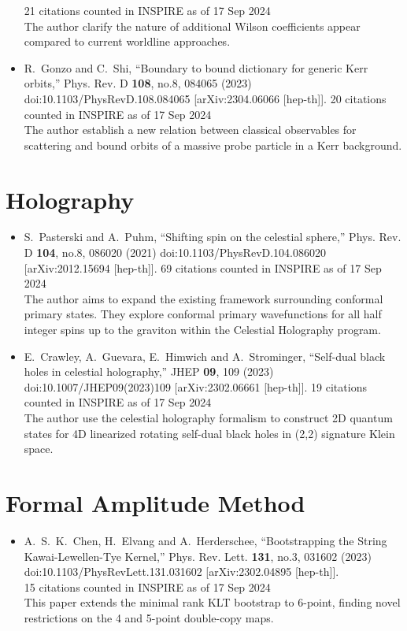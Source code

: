\documentclass[a4paper,12pt]{article}
\begin{document}
\begin{itemize}
    21 citations counted in INSPIRE as of 17 Sep 2024\\
    The author clarify the nature of additional Wilson coefficients appear compared to current worldline approaches.
    \item %
    R.~Gonzo and C.~Shi,
    ``Boundary to bound dictionary for generic Kerr orbits,''
    Phys. Rev. D \textbf{108}, no.8, 084065 (2023)
    doi:10.1103/PhysRevD.108.084065
    [arXiv:2304.06066 [hep-th]].
    20 citations counted in INSPIRE as of 17 Sep 2024\\
    The author establish a new relation between classical observables for scattering and bound orbits of a massive probe particle in a Kerr background.

\end{itemize}
\section*{Holography}
\begin{itemize}
    \item %
    S.~Pasterski and A.~Puhm,
    ``Shifting spin on the celestial sphere,''
    Phys. Rev. D \textbf{104}, no.8, 086020 (2021)
    doi:10.1103/PhysRevD.104.086020
    [arXiv:2012.15694 [hep-th]].
    69 citations counted in INSPIRE as of 17 Sep 2024\\
    The author aims to  expand the existing framework surrounding conformal primary
    states. They explore conformal primary wavefunctions for all half integer spins up to the graviton within the Celestial Holography program.
    \item %
    E.~Crawley, A.~Guevara, E.~Himwich and A.~Strominger,
    ``Self-dual black holes in celestial holography,''
    JHEP \textbf{09}, 109 (2023)
    doi:10.1007/JHEP09(2023)109
    [arXiv:2302.06661 [hep-th]].
    19 citations counted in INSPIRE as of 17 Sep 2024\\
    The author use the celestial holography formalism to construct 2D quantum states for 4D linearized rotating self-dual black holes in (2,2) signature Klein space.
\end{itemize}
\section*{Formal Amplitude Method}
\begin{itemize}
    \item  %
    A.~S.~K.~Chen, H.~Elvang and A.~Herderschee,
    ``Bootstrapping the String Kawai-Lewellen-Tye Kernel,''
    Phys. Rev. Lett. \textbf{131}, no.3, 031602 (2023)\\
    doi:10.1103/PhysRevLett.131.031602
    [arXiv:2302.04895 [hep-th]].\\
    15 citations counted in INSPIRE as of 17 Sep 2024\\
    This paper extends the minimal rank KLT bootstrap to 6-point, finding novel restrictions on the 4
    and 5-point double-copy maps.
\end{itemize}
\end{document}
